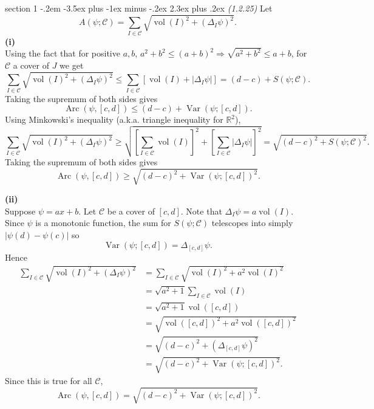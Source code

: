 \documentclass[12pt]{article}
\makeatletter
\theoremstyle{norm}
\newcommand{\R}[0]{\mathbb{R}}
\providecommand{\cal}[1]{\mathcal{#1}}
\renewcommand{\cal}[1]{\mathcal{#1}}
\newcommand{\De}[0]{\Delta}
\newcommand{\ba}[1]{\left[ {#1} \right]}
\newcommand{\subprob}[1]{\noindent\textbf{#1}\\}
\newcommand{\Arc}{\operatorname{Arc}}
\newcommand{\Var}{\operatorname{Var}}
\newcommand{\vol}[0]{\operatorname{vol}}
\newenvironment{problem}{\@startsection
       {section}
       {1}
       {-.2em}
       {-3.5ex plus -1ex minus -.2ex}
       {2.3ex plus .2ex}
       {\pagebreak[3]%
       \large\bf\noindent{Problem }
       }
       }
       {%
       }
\makeatother
\begin{document}
\begin{problem} {\it (1.2.25)}
Let
\[A(\psi;\cal C)=\sum_{I\in \cal C}\sqrt{\vol(I)^2+(\De_I\psi)^2}.\]
\subprob{(i)}
Using the fact that for positive $a,b$, $a^2+b^2\leq (a+b)^2\Rightarrow \sqrt{a^2+b^2}\leq a+b$, for $\cal C$ a cover of $J$ we get
\[
\sum_{I\in \cal C}\sqrt{\vol(I)^2+(\De_I\psi)^2}
\leq \sum_{I\in \cal C}[\vol(I)+|\De_I \psi|]
=
(d-c)+S(\psi; \cal C).
\]
Taking the supremum of both sides gives
\begin{equation}\label{p1-4-1}
\Arc(\psi,[c,d])\leq (d-c)+\Var(\psi;[c,d]).
\end{equation}
Using Minkowski's inequality (a.k.a. triangle inequality for $\R^2$),
\begin{equation}\label{p1-4-1-2}
\sum_{I\in \cal C}\sqrt{\vol(I)^2+(\De_I\psi)^2}
\geq \sqrt{\ba{\sum_{I\in \cal C}\vol(I)}^2+\ba{\sum_{I\in \cal C}|\De_I \psi|}^2}
=\sqrt{(d-c)^2+S(\psi;\cal C)^2}.
\end{equation}
Taking the supremum of both sides gives
\begin{equation}\label{p1-4-2}
\Arc(\psi,[c,d])\geq \sqrt{(d-c)^2+\Var(\psi;[c,d])^2}.
\end{equation}

\subprob{(ii)}
Suppose $\psi=ax+b$. Let $\cal C$ be a cover of $[c,d]$. Note that $\De_I\psi=a\vol(I)$. Since $\psi$ is a monotonic function, the sum for $S(\psi;\cal C)$ telescopes into simply $|\psi(d)-\psi(c)|$ so
\[
\Var(\psi;[c,d])=\De_{[c,d]}\psi.
\]
Hence
\begin{align*}
\sum_{I\in \cal C}\sqrt{\vol(I)^2+(\De_I\psi)^2}
&=\sum_{I\in \cal C}\sqrt{\vol(I)^2+a^2\vol(I)^2}\\
&=\sqrt{a^2+1}\sum_{I\in \cal C}\vol(I)\\
&=\sqrt{a^2+1}\vol([c,d])\\
&=\sqrt{\vol([c,d])^2+a^2\vol([c,d])^2}\\
&=\sqrt{(d-c)^2+(\De_{[c,d]}\psi)^2}\\
&=\sqrt{(d-c)^2+
\Var(\psi;[c,d])^2}.
\end{align*}
Since this is true for all $\cal C$,
\[
\Arc(\psi,[c,d])= \sqrt{(d-c)^2+\Var(\psi;[c,d])^2}.
\]


\end{problem}
\end{document}
